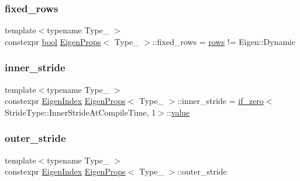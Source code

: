 \mbox{\label{struct_eigen_props_a4fdf3fa6c9908561ddfac176c9c106f7}} 
\subsubsection{\texorpdfstring{fixed\_rows}{fixed\_rows}}
{\footnotesize\ttfamily template$<$typename Type\+\_\+ $>$ \\
constexpr \mbox{\hyperlink{asdl_8h_af6a258d8f3ee5206d682d799316314b1}{bool}} \mbox{\hyperlink{struct_eigen_props}{Eigen\+Props}}$<$ Type\+\_\+ $>$\+::fixed\+\_\+rows = \mbox{\hyperlink{struct_eigen_props_a2f00028920ef3138640e602c80ff9a0d}{rows}} != Eigen\+::\+Dynamic\hspace{0.3cm}{\ttfamily [static]}}

\mbox{\label{struct_eigen_props_aadd1cceef220ef97abe8eb74f1f78ecd}} 
\subsubsection{\texorpdfstring{inner\_stride}{inner\_stride}}
{\footnotesize\ttfamily template$<$typename Type\+\_\+ $>$ \\
constexpr \mbox{\hyperlink{eigen_8h_a4e595ab182718d84a409dd05e0829bdd}{Eigen\+Index}} \mbox{\hyperlink{struct_eigen_props}{Eigen\+Props}}$<$ Type\+\_\+ $>$\+::inner\+\_\+stride = \mbox{\hyperlink{struct_eigen_props_aa728072a2702217ee987bf9ab3b9d07d}{if\+\_\+zero}}$<$Stride\+Type\+::\+Inner\+Stride\+At\+Compile\+Time, 1$>$\+::\mbox{\hyperlink{_s_d_l__opengl__glext_8h_a8ad81492d410ff2ac11f754f4042150f}{value}}\hspace{0.3cm}{\ttfamily [static]}}

\mbox{\label{struct_eigen_props_ac31d9e8cc3baff0f804000486c35759d}} 
\subsubsection{\texorpdfstring{outer\_stride}{outer\_stride}}
{\footnotesize\ttfamily template$<$typename Type\+\_\+ $>$ \\
constexpr \mbox{\hyperlink{eigen_8h_a4e595ab182718d84a409dd05e0829bdd}{Eigen\+Index}} \mbox{\hyperlink{struct_eigen_props}{Eigen\+Props}}$<$ Type\+\_\+ $>$\+::outer\+\_\+stride\hspace{0.3cm}{\ttfamily [static]}}


